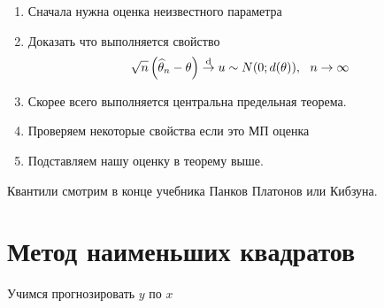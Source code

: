\documentclass[12pt]{article}
\begin{document}
\begin{enumerate}
    \itemsep0em
    \item Сначала нужна оценка неизвестного параметра
    \item Доказать что выполняется свойство
        \begin{eqnarray*}
            \sqrt{n}\left(\widehat{\theta}_{n}-\theta\right)
            \stackrel{\textmd{d}}{\to }
            u \sim N(0;d(\theta)),\ \ n \to\infty
        \end{eqnarray*}
    \item Скорее всего выполняется центральна предельная теорема.
    \item Проверяем некоторые свойства если это МП оценка
    \item Подставляем нашу оценку в теорему выше.
\end{enumerate}

\par Квантили смотрим в конце учебника Панков Платонов или Кибзуна.

\section{Метод наименьших квадратов}
Учимся прогнозировать $y$ по $x$
\end{document}
